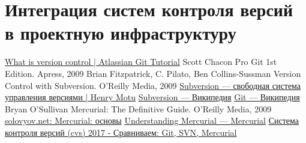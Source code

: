 \documentclass{../industrial-development}
\begin{document}
\section{Интеграция систем контроля версий в проектную инфраструктуру}


\begin{thebibliography}{99}
 \href{https://www.atlassian.com/git/tutorials/what-is-version-control}{What is version control | Atlassian Git Tutorial}
 Scott Chacon Pro Git 1st Edition. Apress, 2009
 	Brian Fitzpatrick, C. Pilato, Ben Collins-Sussman Version Control with Subversion. O'Reilly Media, 2009
 \href{http://henry-motu.org.ua/2010/10/02/subversion-svobodnaja-sistema-upravkenija-versijam/}{Subversion --- свободная система управления версиями | Henry Motu}
 \href{https://ru.wikipedia.org/wiki/Subversion}{Subversion --- Википедия}
 \href{https://ru.wikipedia.org/wiki/Git}{Git --- Википедия}
 Bryan O'Sullivan Mercurial: The Definitive Guide. O'Reilly Media, 2009
 \href{https://solovyov.net/blog/2008/mercurial-basics/}{solovyov.net: Mercurial: основы}
 \href{https://www.mercurial-scm.org/wiki/RussianUnderstandingMercurial}{Understanding Mercurial --- Mercurial}
 \href{https://biz30.timedoctor.com/ru/cистема-контроля-версий/}{Система контроля версий (cvs) 2017 - Сравниваем: Git, SVN, Mercurial}
\end{thebibliography}
\end{document}
